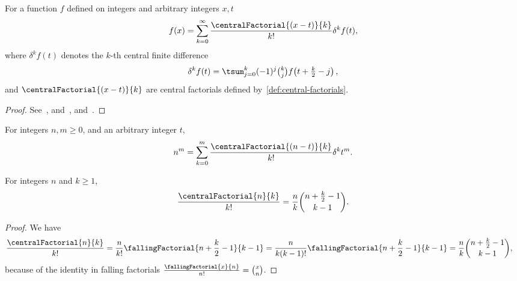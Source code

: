 \begin{lemma}
  For a function $f$ defined on integers and arbitrary integers $x,t$
  \label{lem:centra-newtons-formula}
  \begin{align*}
    f(x)
    = \sum_{k=0}^{\infty} \frac{\centralFactorial{(x-t)}{k}}{k!} \delta^{k} f(t),
  \end{align*}
  where $\delta^{k} f(t)$ denotes the $k$-th central finite difference
  \begin{align*}
    \delta^{k} f(t) = \tsum_{j=0}^{k} (-1)^j \tbinom{k}{j} f\!\left(t+\tfrac{k}{2} - j\right),
  \end{align*}
  and $\centralFactorial{(x-t)}{k}$ are central factorials
  defined by~\eqref{def:central-factorials}.
  \begin{proof}
    See~\cite[p.~462]{butzer1989central}, and~\cite[section 2, eq. (19)]{steffensen1927interpolation},
    and~\cite[section 6, eq. (21)]{riordan1968combinatorial}.
  \end{proof}
\end{lemma}


\begin{lemma}
  \label{lem:central-newtons-formula-for-powers}
  For integers $n,m \geq 0$, and an arbitrary integer $t$,
  \begin{align*}
    n^m = \sum_{k=0}^{m} \frac{\centralFactorial{(n-t)}{k}}{k!} \delta^{k} t^m.
  \end{align*}
\end{lemma}

\begin{lemma}
  \label{lem:central-factorials-binomial-form}
  For integers $n$ and $k \geq 1$,
  \begin{align*}
    \frac{\centralFactorial{n}{k}}{k!}
    = \frac{n}{k} \binom{n+\frac{k}{2}-1}{k-1}.
  \end{align*}
  \begin{proof}
    We have
    \begin{align*}
      \frac{\centralFactorial{n}{k}}{k!}
      &= \frac{n}{k!}\fallingFactorial{n+\frac{k}{2}-1}{k-1}
      = \frac{n}{k (k-1)!} \fallingFactorial{n+\frac{k}{2}-1}{k-1}
      = \frac{n}{k} \binom{n+\frac{k}{2}-1}{k-1},
    \end{align*}
    because of the identity in falling factorials
    $\frac{\fallingFactorial{x}{n}}{n!} = \binom{x}{n}$.
  \end{proof}
\end{lemma}

